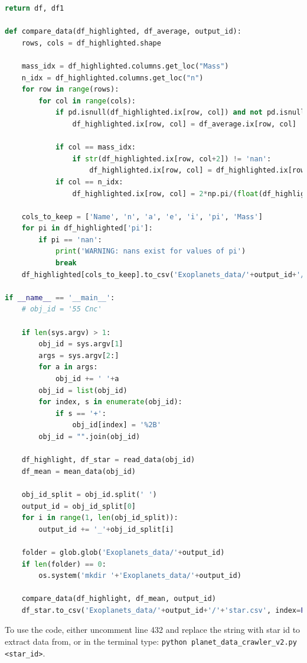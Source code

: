 \documentclass[11pt, oneside]{article}   	%
\begin{document}
\begin{lstlisting}[language=Python, caption={Extracting data from \href{https://exoplanetarchive.ipac.caltech.edu/}{Nasa Exoplanet Archive}}]
    return df, df1

def compare_data(df_highlighted, df_average, output_id):
    rows, cols = df_highlighted.shape

    mass_idx = df_highlighted.columns.get_loc("Mass")
    n_idx = df_highlighted.columns.get_loc("n")
    for row in range(rows):
        for col in range(cols):
            if pd.isnull(df_highlighted.ix[row, col]) and not pd.isnull(df_average.ix[row, col]):
                df_highlighted.ix[row, col] = df_average.ix[row, col]

            if col == mass_idx:
                if str(df_highlighted.ix[row, col+2]) != 'nan':
                    df_highlighted.ix[row, col] = df_highlighted.ix[row, col+2]
            if col == n_idx:
                df_highlighted.ix[row, col] = 2*np.pi/(float(df_highlighted.ix[row, col])/365)*180/np.pi
    
    cols_to_keep = ['Name', 'n', 'a', 'e', 'i', 'pi', 'Mass']
    for pi in df_highlighted['pi']:
        if pi == 'nan':
            print('WARNING: nans exist for values of pi')
            break
    df_highlighted[cols_to_keep].to_csv('Exoplanets_data/'+output_id+'/'+'planets.csv', index=False)

if __name__ == '__main__':
    # obj_id = '55 Cnc'

    if len(sys.argv) > 1:
        obj_id = sys.argv[1]
        args = sys.argv[2:]
        for a in args:
            obj_id += ' '+a
        obj_id = list(obj_id)
        for index, s in enumerate(obj_id):
            if s == '+':
                obj_id[index] = '%2B'
        obj_id = "".join(obj_id)

    df_highlight, df_star = read_data(obj_id)
    df_mean = mean_data(obj_id)

    obj_id_split = obj_id.split(' ')
    output_id = obj_id_split[0]
    for i in range(1, len(obj_id_split)):
        output_id += '_'+obj_id_split[i]

    folder = glob.glob('Exoplanets_data/'+output_id)
    if len(folder) == 0:
        os.system('mkdir '+'Exoplanets_data/'+output_id)

    compare_data(df_highlight, df_mean, output_id)
    df_star.to_csv('Exoplanets_data/'+output_id+'/'+'star.csv', index=False)

\end{lstlisting}

To use the code, either uncomment line 432 and replace the string with star id to extract data from, or in the terminal type: \texttt{python planet\_data\_crawler\_v2.py <star\_id>}.
\end{document}
